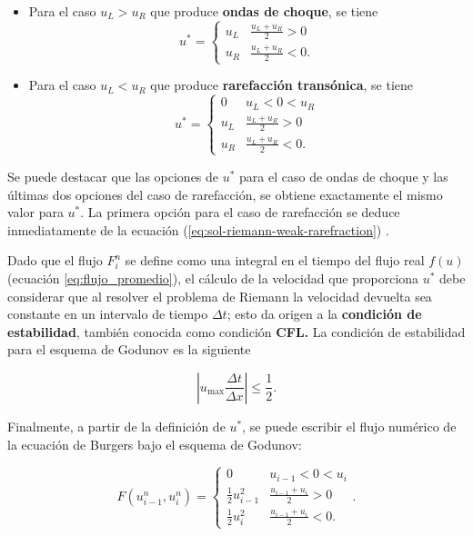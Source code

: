 \documentclass[12pt]{article}
\begin{document}
 	\begin{itemize}
 		\item Para el caso $u_L > u_R$ que produce \textbf{ondas de choque}, se tiene
 		\begin{equation}
 			u^{*} =
 			\begin{cases}
 				u_{L} & \frac{u_L + u_R}{2} > 0 \\
 				u_{R} & \frac{u_L + u_R}{2} < 0.
 			\end{cases}
 		\label{eq:uprima1}
 		\end{equation}
 		\item Para el caso $u_L < u_R$ que produce \textbf{rarefacción transónica}, se tiene
 		\begin{equation}
 			u^{*} =
 			\begin{cases}
 				0 & u_{L} < 0 < u_{R}\\
 				u_{L} & \frac{u_L + u_R}{2} > 0 \\
 				u_{R} & \frac{u_L + u_R}{2} < 0.
 			\end{cases}
 		\label{eq:uprima2}
 		\end{equation}
 	\end{itemize}
 	Se puede destacar que las opciones de $u^{*}$ para el caso de ondas de choque y las últimas dos opciones del caso de rarefacción, se obtiene exactamente el mismo valor para $u^{*}$. La primera opción para el caso de rarefacción se deduce inmediatamente de la ecuación (\ref{eq:sol-riemann-weak-rarefraction}) \cite{pletcher1997computational}.
 	
 	Dado que el flujo $F_{i}^{n}$ se define como una integral en el tiempo del flujo real $f(u)$ (ecuación \ref{eq:flujo_promedio}), el cálculo de la velocidad que proporciona $u^{*}$ debe considerar que al resolver el problema de Riemann la velocidad devuelta sea constante en un intervalo de tiempo $\Delta t$; esto da origen a la \textbf{condición de estabilidad}, también conocida como condición \textbf{CFL.} La condición de estabilidad para el esquema de Godunov es la siguiente \cite{pletcher1997computational}
 	
 	\begin{equation}
 		\left| u_{\text{max}} \frac{\Delta t}{\Delta x}\right| \leq \frac{1}{2} .
 	\end{equation}
 	 
 	 Finalmente, a partir de la definición de $u^{*}$, se puede escribir el flujo numérico de la ecuación de Burgers bajo el esquema de Godunov:
  	
  	\begin{equation}
  		\boxed{F(u_{i-1}^{n}, u_{i}^{n}) =
  		\begin{cases}
  			0 & u_{i-1} < 0 < u_{i}\\
  			\frac{1}{2}u_{i-1}^{2} & \frac{u_{i-1} + u_{i}}{2} > 0 \\
  			\frac{1}{2}u_{i}^{2} & \frac{u_{i-1} + u_{i}}{2} < 0.
  		\end{cases}.}
  		\label{eq:flujo-godunov}
  	\end{equation}
 	 
\end{document}
